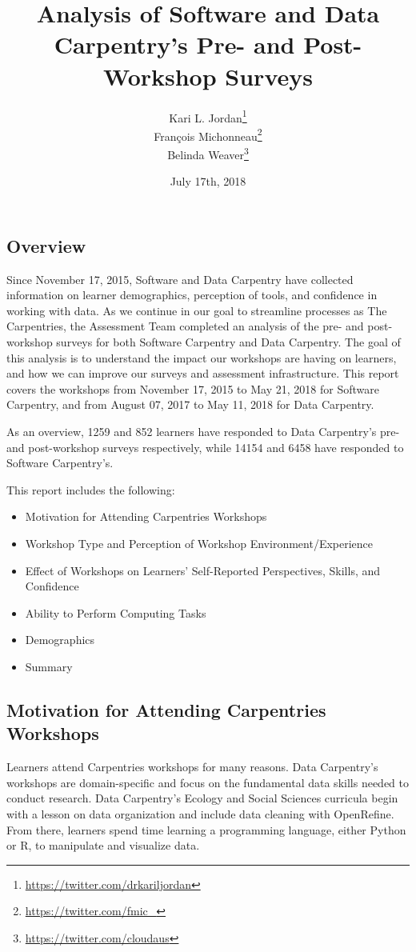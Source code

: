 \documentclass[]{article}
\title{Analysis of Software and Data Carpentry's Pre- and Post-Workshop Surveys}
\author{Kari L. Jordan\footnote{\url{https://twitter.com/drkariljordan}} \\ François Michonneau\footnote{\url{https://twitter.com/fmic_}} \\ Belinda Weaver\footnote{\url{https://twitter.com/cloudaus}}}
\date{July 17th, 2018}
\providecommand{\tightlist}{%
  \setlength{\itemsep}{0pt}\setlength{\parskip}{0pt}}
\begin{document}
\maketitle

{
\setcounter{tocdepth}{2}
\tableofcontents
}
\subsection{Overview}\label{overview}

Since November 17, 2015, Software and Data Carpentry have collected
information on learner demographics, perception of tools, and confidence
in working with data. As we continue in our goal to streamline processes
as The Carpentries, the Assessment Team completed an analysis of the
pre- and post-workshop surveys for both Software Carpentry and Data
Carpentry. The goal of this analysis is to understand the impact our
workshops are having on learners, and how we can improve our surveys and
assessment infrastructure. This report covers the workshops from
November 17, 2015 to May 21, 2018 for Software Carpentry, and from
August 07, 2017 to May 11, 2018 for Data Carpentry.

As an overview, 1259 and 852 learners have responded to Data Carpentry's
pre- and post-workshop surveys respectively, while 14154 and 6458 have
responded to Software Carpentry's.

This report includes the following:

\begin{itemize}
\tightlist
\item
  Motivation for Attending Carpentries Workshops
\item
  Workshop Type and Perception of Workshop Environment/Experience
\item
  Effect of Workshops on Learners' Self-Reported Perspectives, Skills,
  and Confidence
\item
  Ability to Perform Computing Tasks
\item
  Demographics
\item
  Summary
\end{itemize}

\subsection{Motivation for Attending Carpentries
Workshops}\label{motivation-for-attending-carpentries-workshops}

Learners attend Carpentries workshops for many reasons. Data Carpentry's
workshops are domain-specific and focus on the fundamental data skills
needed to conduct research. Data Carpentry's Ecology and Social Sciences
curricula begin with a lesson on data organization and include data
cleaning with OpenRefine. From there, learners spend time learning a
programming language, either Python or R, to manipulate and visualize
data.
\end{document}
